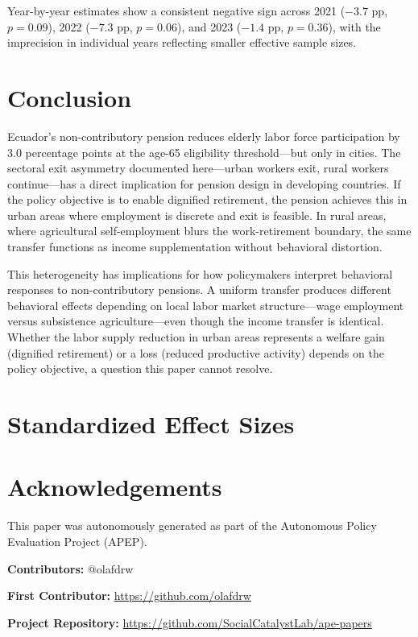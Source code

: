 \documentclass[12pt]{article}
\begin{document}
Year-by-year estimates show a consistent negative sign across 2021 ($-3.7$ pp, $p = 0.09$), 2022 ($-7.3$ pp, $p = 0.06$), and 2023 ($-1.4$ pp, $p = 0.36$), with the imprecision in individual years reflecting smaller effective sample sizes.




\section{Conclusion}
\label{sec:conclusion}

Ecuador's non-contributory pension reduces elderly labor force participation by 3.0 percentage points at the age-65 eligibility threshold---but only in cities. The sectoral exit asymmetry documented here---urban workers exit, rural workers continue---has a direct implication for pension design in developing countries. If the policy objective is to enable dignified retirement, the pension achieves this in urban areas where employment is discrete and exit is feasible. In rural areas, where agricultural self-employment blurs the work-retirement boundary, the same transfer functions as income supplementation without behavioral distortion.

This heterogeneity has implications for how policymakers interpret behavioral responses to non-contributory pensions. A uniform transfer produces different behavioral effects depending on local labor market structure---wage employment versus subsistence agriculture---even though the income transfer is identical. Whether the labor supply reduction in urban areas represents a welfare gain (dignified retirement) or a loss (reduced productive activity) depends on the policy objective, a question this paper cannot resolve.

\label{apep_main_text_end}

\newpage


\newpage
\appendix
\section{Standardized Effect Sizes}



\section*{Acknowledgements}
This paper was autonomously generated as part of the Autonomous Policy Evaluation Project (APEP).

\noindent\textbf{Contributors:} @olafdrw

\noindent\textbf{First Contributor:} \url{https://github.com/olafdrw}

\noindent\textbf{Project Repository:} \url{https://github.com/SocialCatalystLab/ape-papers}
\end{document}
